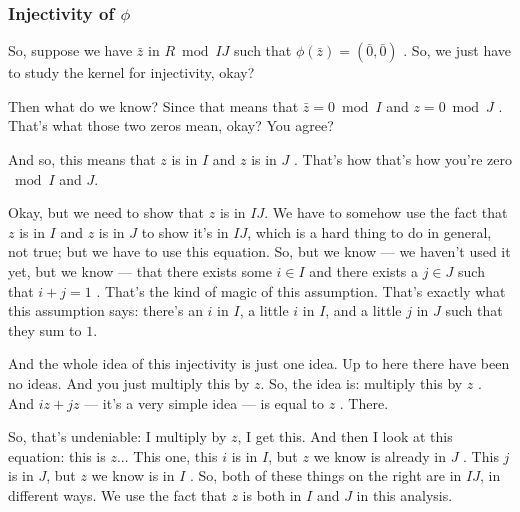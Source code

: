 \begin{proofWrapper}

\subsubsection{Injectivity of \texorpdfstring{$\phi$}{phi}}

\begin{speech}[00:06:11 - 00:07:50]
So, suppose we have $\bar{z}$ in $R \bmod IJ$  such that $\phi(\bar{z}) = (\bar{0}, \bar{0})$ . So, we just have to study the kernel for injectivity, okay?

Then what do we know? Since that means that $\bar{z} = 0 \bmod I$ and $z = 0 \bmod J$ . That's what those two zeros mean, okay? You agree?

And so, this means that $z$ is in $I$ and $z$ is in $J$ . That's how that's how you're zero $\bmod I$ and $J$.

Okay, but we need to show that $z$ is in $IJ$. We have to somehow use the fact that $z$ is in $I$ and $z$ is in $J$ to show it's in $IJ$, which is a hard thing to do in general, not true; but we have to use this equation. So, but we know --- we haven't used it yet, but we know --- that there exists some $i \in I$ and there exists a $j \in J$ such that $i + j = 1$ . That's the kind of magic of this assumption. That's exactly what this assumption says: there's an $i$ in $I$, a little $i$ in $I$, and a little $j$ in $J$ such that they sum to $1$.
\end{speech}

\begin{speech}[00:07:50 - 00:09:25]
And the whole idea of this injectivity is just one idea. Up to here there have been no ideas. And you just multiply this by $z$. So, the idea is: multiply this by $z$ . And $iz + jz$ --- it's a very simple idea --- is equal to $z$ . There.

So, that's undeniable: I multiply by $z$, I get this. And then I look at this equation: this is $z$... This one, this $i$ is in $I$, but $z$ we know is already in $J$ . This $j$ is in $J$, but $z$ we know is in $I$ . So, both of these things on the right are in $IJ$, in different ways. We use the fact that $z$ is both in $I$ and $J$ in this analysis.


\end{speech}
\end{proofWrapper}
